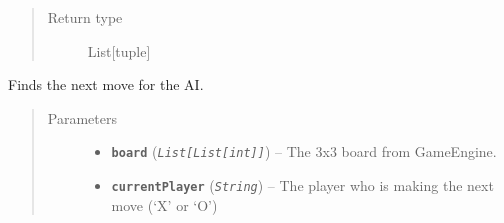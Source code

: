 \documentclass[letterpaper,10pt,english]{sphinxmanual}
\begin{document}
\begin{fulllineitems}
\begin{fulllineitems}
\begin{quote}
\begin{description}
\item[{Return type}] \leavevmode
List{[}tuple{]}

\end{description}\end{quote}

\end{fulllineitems}


\begin{fulllineitems}
\label{index:AI._AIMedium.nextMove}
Finds the next move for the AI.
\begin{quote}\begin{description}
\item[{Parameters}] \leavevmode\begin{itemize}
\item {} 
\textbf{\texttt{board}} (\emph{\texttt{List{[}List{[}int{]}{]}}}) -- The 3x3 board from GameEngine.

\item {} 
\textbf{\texttt{currentPlayer}} (\emph{\texttt{String}}) -- The player who is making the next move (`X' or `O')

\end{itemize}

\end{description}\end{quote}

\end{fulllineitems}


\end{fulllineitems}

\end{document}
